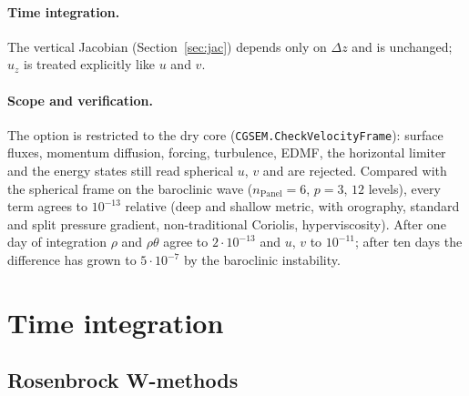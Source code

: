 \documentclass[11pt,a4paper]{article}
\newcommand{\code}[1]{\texttt{#1}}
\begin{document}
\paragraph{Time integration.}
The vertical Jacobian (Section~\ref{sec:jac}) depends only on $\Delta z$ and
is unchanged; $u_z$ is treated explicitly like $u$ and $v$.

\paragraph{Scope and verification.}
The option is restricted to the dry core
(\code{CGSEM.CheckVelocityFrame}): surface fluxes, momentum diffusion,
forcing, turbulence, EDMF, the horizontal limiter and the energy states still
read spherical $u$, $v$ and are rejected. Compared with the spherical frame
on the baroclinic wave ($n_{\text{Panel}} = 6$, $p = 3$, $12$ levels), every
term agrees to $10^{-13}$ relative (deep and shallow metric, with
orography, standard and split pressure gradient, non-traditional Coriolis,
hyperviscosity). After one day of integration $\rho$ and $\rho\theta$ agree
to $2\cdot10^{-13}$ and $u$, $v$ to $10^{-11}$; after ten days the
difference has grown to $5\cdot10^{-7}$ by the baroclinic instability.

\section{Time integration}

\subsection{Rosenbrock W-methods}
\end{document}
